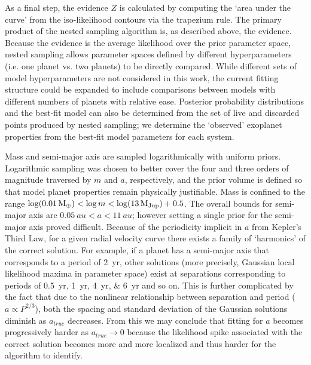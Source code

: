 \documentclass[12pt,manuscript]{aastex}
\begin{document}
As a final step, the evidence $Z$ is calculated by computing the `area under the curve' from the iso-likelihood contours via the trapezium rule.
The primary product of the nested sampling algorithm is, as described above, the evidence.
Because the evidence is the average likelihood over the prior parameter space, nested sampling allows parameter spaces defined by different hyperparameters (i.e. one planet vs. two planets) to be directly compared.
While different sets of model hyperparameters are not considered in this work, the current fitting structure could be expanded to include comparisons between models with different numbers of planets with relative ease.
Posterior probability distributions and the best-fit model can also be determined from the set of live and discarded points produced by nested sampling; we determine the `observed' exoplanet properties from the best-fit model parameters for each system.

Mass and semi-major axis are sampled logarithmically with uniform priors.
Logarithmic sampling was chosen to better cover the four and three orders of magnitude traversed by $m$ and $a$, respectively, and the prior volume is defined so that model planet properties remain physically justifiable.
Mass is confined to the range $\log(\SI{0.01}{M_\oplus}) < \log m < \log (\SI{13}{M_{Jup}}) + 0.5$.
The overall bounds for semi-major axis are $\SI{0.05}{au} < a < \SI{11}{au}$; however setting a single prior for the semi-major axis proved difficult.
Because of the periodicity implicit in $a$ from Kepler's Third Law, for a given radial velocity curve there exists a family of `harmonics' of the correct solution.
For example, if a planet has a semi-major axis that corresponds to a period of \SI{2}{yr}, other solutions (more precisely, Gaussian local likelihood maxima in parameter space) exist at separations corresponding to periods of \SIlist[list-final-separator={, }] {0.5;1;4;6}{yr} and so on.
This is further complicated by the fact that due to the nonlinear relationship between separation and period ($a \propto P^{2/3}$), both the spacing and standard deviation of the Gaussian solutions diminish as $a_{true}$ decreases. 
From this we may conclude that fitting for $a$ becomes progressively harder as $a_{true} \to 0$ because the likelihood spike associated with the correct solution becomes more and more localized and thus harder for the algorithm to identify.
\end{document}
